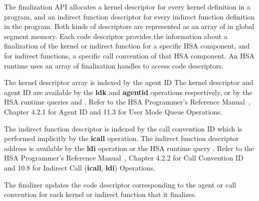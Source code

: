 \documentclass[final,oneside]{book}
\newcommand{\reffun}[1]{\textbf{#1}}
\newcommand{\refhsl}[1]{\reffun{#1}}
\begin{document}
The finalization API allocates a kernel descriptor for every kernel definition in a
program, and an indirect function descriptor for every indirect function
definition in the program. Both kinds of descriptors are represented as an array
of  in global segment memory. Each code
descriptor provides the information about a finalization of the kernel or
indirect function for a specific HSA component, and for indirect functions, a
specific call convention of that HSA component. An HSA runtime uses an array of
finalization handles  to access code
descriptors.

The kernel descriptor array is indexed by the agent ID
 The kernel descriptor and agent ID are
available by the \refhsl{ldk} and \refhsl{agentid} operations respectively, or
by the HSA runtime queries  and
. Refer to the HSA Programmer's Reference
Manual~\cite{prm}, Chapter 4.2.1 for Agent ID and 11.3 for User Mode Queue
Operations.

The indirect function descriptor is indexed by the call convention ID
 which is performed implicitly by
the \refhsl{icall} operation. The indirect function descriptor address is
available by the \refhsl{ldi} operation or the HSA runtime query
. Refer to the HSA
Programmer's Reference Manual~\cite{prm}, Chapter 4.2.2 for Call Convention ID
and 10.8 for Indirect Call (\refhsl{icall}, \refhsl{ldi}) Operations.

The finalizer updates the code descriptor corresponding to the agent or call
convention for each kernel or indirect function that it finalizes.
\end{document}
